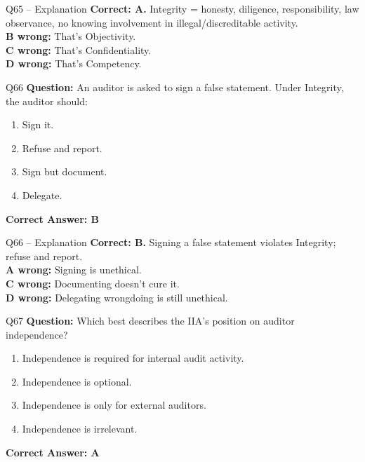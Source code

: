 \documentclass[aspectratio=169,10pt]{beamer}
\begin{document}
	\begin{frame}[t]{Q65 -- Explanation}
		\small
		\textbf{Correct: A.} Integrity = honesty, diligence, responsibility, law observance, no knowing involvement in illegal/discreditable activity. \\[4pt]
		\textbf{B wrong:} That's Objectivity. \\[2pt]
		\textbf{C wrong:} That's Confidentiality. \\[2pt]
		\textbf{D wrong:} That's Competency.
	\end{frame}
	
	\begin{frame}[t]{Q66}
		\small
		\textbf{Question:} An auditor is asked to sign a false statement. Under Integrity, the auditor should:
		\begin{enumerate}[label=\Alph*.,itemsep=1pt,topsep=2pt]
			\item Sign it.
			\item Refuse and report.
			\item Sign but document.
			\item Delegate.
		\end{enumerate}
		\vspace{4pt}
		\textbf{Correct Answer: B}
	\end{frame}
	
	\begin{frame}[t]{Q66 -- Explanation}
		\small
		\textbf{Correct: B.} Signing a false statement violates Integrity; refuse and report. \\[4pt]
		\textbf{A wrong:} Signing is unethical. \\[2pt]
		\textbf{C wrong:} Documenting doesn't cure it. \\[2pt]
		\textbf{D wrong:} Delegating wrongdoing is still unethical.
	\end{frame}
	
	\begin{frame}[t]{Q67}
		\small
		\textbf{Question:} Which best describes the IIA's position on auditor independence?
		\begin{enumerate}[label=\Alph*.,itemsep=1pt,topsep=2pt]
			\item Independence is required for internal audit activity.
			\item Independence is optional.
			\item Independence is only for external auditors.
			\item Independence is irrelevant.
		\end{enumerate}
		\vspace{4pt}
		\textbf{Correct Answer: A}
	\end{frame}
	
\end{document}
